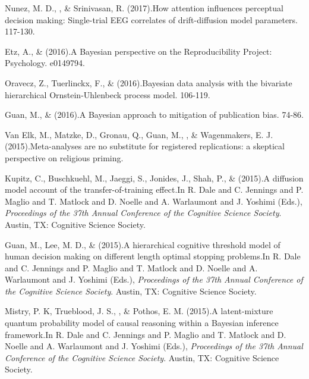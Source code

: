 \item[37.] Nunez, M. D., \vdkh{}, \& Srinivasan, R. (2017).\newblock How attention influences perceptual decision making: Single-trial EEG correlates of drift-diffusion model parameters. 117-130. %

\item[36.] Etz, A., \& \vdkh{} (2016).\newblock A Bayesian perspective on the Reproducibility Project: Psychology. e0149794. %

\item[35.] Oravecz, Z., Tuerlinckx, F., \& \vdkh{} (2016).\newblock Bayesian data analysis with the bivariate hierarchical Ornstein-Uhlenbeck process model. 106-119. %

\item[34.] Guan, M., \& \vdkh{} (2016).\newblock A Bayesian approach to mitigation of publication bias. 74-86. %

\item[33.] Van Elk, M., Matzke, D., Gronau, Q., Guan, M., \vdkh{}, \& Wagenmakers, E. J. (2015).\newblock Meta-analyses are no substitute for registered replications: a skeptical perspective on religious priming. %

\item[32.] Kupitz, C., Buschkuehl, M., Jaeggi, S., Jonides, J., Shah, P., \& \vdkh{} (2015).\newblock A diffusion model account of the transfer-of-training effect.\newblock In R. Dale and C. Jennings and P. Maglio and T. Matlock and D. Noelle and A. Warlaumont and J. Yoshimi (Eds.), {\em Proceedings of the 37th Annual Conference of the Cognitive Science Society}. Austin, TX: Cognitive Science Society. %

\item[31.] Guan, M., Lee, M. D., \& \vdkh{} (2015).\newblock A hierarchical cognitive threshold model of human decision making on different length optimal stopping problems.\newblock In R. Dale and C. Jennings and P. Maglio and T. Matlock and D. Noelle and A. Warlaumont and J. Yoshimi (Eds.), {\em Proceedings of the 37th Annual Conference of the Cognitive Science Society}. Austin, TX: Cognitive Science Society. %

\item[30.] Mistry, P. K, Trueblood, J. S., \vdkh{}, \& Pothos, E. M. (2015).\newblock A latent-mixture quantum probability model of causal reasoning within a Bayesian inference framework.\newblock In R. Dale and C. Jennings and P. Maglio and T. Matlock and D. Noelle and A. Warlaumont and J. Yoshimi (Eds.), {\em Proceedings of the 37th Annual Conference of the Cognitive Science Society}. Austin, TX: Cognitive Science Society. %

